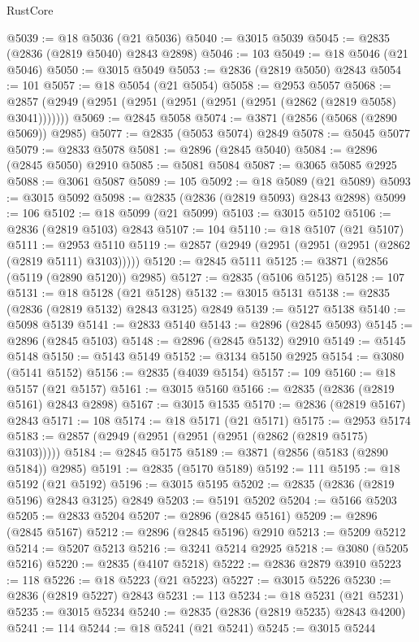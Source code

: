 \begin{lexlean}{RustCore}
\begin{coremodule}
@5039 := @18 @5036 (@21 @5036)
@5040 := @3015 @5039
@5045 := @2835 (@2836 (@2819 @5040) @2843 @2898)
@5046 := 103
@5049 := @18 @5046 (@21 @5046)
@5050 := @3015 @5049
@5053 := @2836 (@2819 @5050) @2843
@5054 := 101
@5057 := @18 @5054 (@21 @5054)
@5058 := @2953 @5057
@5068 := @2857 (@2949 (@2951 (@2951 (@2951 (@2951 (@2951 (@2862 (@2819 @5058) @3041)))))))
@5069 := @2845 @5058
@5074 := @3871 (@2856 (@5068 (@2890 @5069)) @2985)
@5077 := @2835 (@5053 @5074) @2849
@5078 := @5045 @5077
@5079 := @2833 @5078
@5081 := @2896 (@2845 @5040)
@5084 := @2896 (@2845 @5050) @2910
@5085 := @5081 @5084
@5087 := @3065 @5085 @2925
@5088 := @3061 @5087
@5089 := 105
@5092 := @18 @5089 (@21 @5089)
@5093 := @3015 @5092
@5098 := @2835 (@2836 (@2819 @5093) @2843 @2898)
@5099 := 106
@5102 := @18 @5099 (@21 @5099)
@5103 := @3015 @5102
@5106 := @2836 (@2819 @5103) @2843
@5107 := 104
@5110 := @18 @5107 (@21 @5107)
@5111 := @2953 @5110
@5119 := @2857 (@2949 (@2951 (@2951 (@2951 (@2862 (@2819 @5111) @3103)))))
@5120 := @2845 @5111
@5125 := @3871 (@2856 (@5119 (@2890 @5120)) @2985)
@5127 := @2835 (@5106 @5125)
@5128 := 107
@5131 := @18 @5128 (@21 @5128)
@5132 := @3015 @5131
@5138 := @2835 (@2836 (@2819 @5132) @2843 @3125) @2849
@5139 := @5127 @5138
@5140 := @5098 @5139
@5141 := @2833 @5140
@5143 := @2896 (@2845 @5093)
@5145 := @2896 (@2845 @5103)
@5148 := @2896 (@2845 @5132) @2910
@5149 := @5145 @5148
@5150 := @5143 @5149
@5152 := @3134 @5150 @2925
@5154 := @3080 (@5141 @5152)
@5156 := @2835 (@4039 @5154)
@5157 := 109
@5160 := @18 @5157 (@21 @5157)
@5161 := @3015 @5160
@5166 := @2835 (@2836 (@2819 @5161) @2843 @2898)
@5167 := @3015 @1535
@5170 := @2836 (@2819 @5167) @2843
@5171 := 108
@5174 := @18 @5171 (@21 @5171)
@5175 := @2953 @5174
@5183 := @2857 (@2949 (@2951 (@2951 (@2951 (@2862 (@2819 @5175) @3103)))))
@5184 := @2845 @5175
@5189 := @3871 (@2856 (@5183 (@2890 @5184)) @2985)
@5191 := @2835 (@5170 @5189)
@5192 := 111
@5195 := @18 @5192 (@21 @5192)
@5196 := @3015 @5195
@5202 := @2835 (@2836 (@2819 @5196) @2843 @3125) @2849
@5203 := @5191 @5202
@5204 := @5166 @5203
@5205 := @2833 @5204
@5207 := @2896 (@2845 @5161)
@5209 := @2896 (@2845 @5167)
@5212 := @2896 (@2845 @5196) @2910
@5213 := @5209 @5212
@5214 := @5207 @5213
@5216 := @3241 @5214 @2925
@5218 := @3080 (@5205 @5216)
@5220 := @2835 (@4107 @5218)
@5222 := @2836 @2879 @3910
@5223 := 118
@5226 := @18 @5223 (@21 @5223)
@5227 := @3015 @5226
@5230 := @2836 (@2819 @5227) @2843
@5231 := 113
@5234 := @18 @5231 (@21 @5231)
@5235 := @3015 @5234
@5240 := @2835 (@2836 (@2819 @5235) @2843 @4200)
@5241 := 114
@5244 := @18 @5241 (@21 @5241)
@5245 := @3015 @5244

\end{coremodule}
\end{lexlean}
